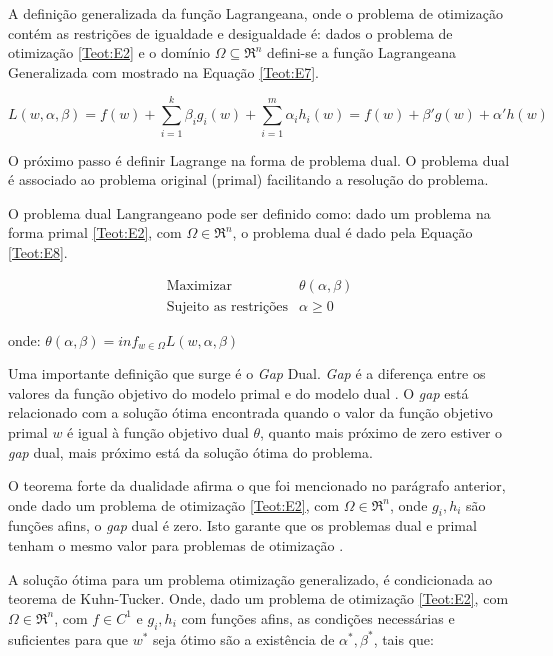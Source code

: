 A definição generalizada da função Lagrangeana, onde o problema de otimização contém as restrições de igualdade e desigualdade é: dados o problema de otimização \ref{Teot:E2} e o domínio $\Omega \subseteq \Re^n$ defini-se a função Lagrangeana Generalizada com mostrado na Equação \ref{Teot:E7}.

\begin{equation}\label{Teot:E7}
L(w,\alpha,\beta) = f(w) + \sum_{i=1}^k \beta_{i}g_{i}(w)+\sum_{i=1}^m \alpha_{i}h_{i}(w) = f(w)+\beta ' g(w)+\alpha ' h(w)
\end{equation}

O próximo passo é definir Lagrange na forma de problema dual. O problema dual é associado ao problema original (primal) facilitando a resolução do problema.

O problema dual Langrangeano pode ser definido como: dado um problema na forma primal \ref{Teot:E2}, com $\Omega \in \Re^n$, o problema dual é dado pela Equação \ref{Teot:E8}.

\begin{equation} \label{Teot:E8}
\begin{matrix}
\text{Maximizar} & \theta(\alpha,\beta) \\ 
\text{Sujeito as restrições}&    \alpha \geq 0
\end{matrix}
\end{equation}

onde: $\theta(\alpha,\beta) = inf_{w \in \Omega}L(w,\alpha,\beta)$

Uma importante definição que surge é o \textit{Gap} Dual. \textit{Gap} é a diferença entre os valores da função objetivo do modelo primal e do modelo dual \cite{Cristianini2000}. O \textit{gap} está relacionado com a solução ótima encontrada quando o valor da função objetivo primal $w$ é igual à função objetivo dual $\theta$, quanto mais próximo de zero estiver o \textit{gap} dual, mais próximo está da solução ótima do problema.

O teorema forte da dualidade afirma o que foi mencionado no parágrafo anterior, onde dado um problema de otimização \ref{Teot:E2}, com $\Omega \in \Re^n$, onde $g_{i},h_{i}$ são funções afins, o \textit{gap} dual é zero. Isto garante que os problemas dual e primal tenham o mesmo valor para problemas de otimização \cite{Cristianini2000}.

A solução ótima para um problema otimização generalizado, é condicionada ao teorema de Kuhn-Tucker. Onde, dado um problema de otimização \ref{Teot:E2}, com $\Omega \in \Re^n$, com $f \in C^1$ e $g_{i},h_{i}$ com funções afins, as condições necessárias e suficientes para que $w^*$ seja ótimo são a existência de $\alpha^*,\beta^*$, tais que:

